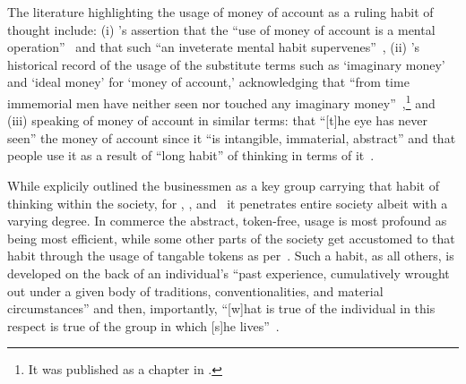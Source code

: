 

The literature highlighting the usage of money of account as a ruling habit of thought include: (i) \citeauthor{colwell1859}'s assertion that the ``use of money of account is a mental operation''~\citep[p.~3]{colwell1859} and that such ``an inveterate mental habit supervenes''~\citep[p.~687]{colwell1860}, (ii) \citeauthor{einaudi1953}'s historical record of the usage of the substitute terms such as `imaginary money' and `ideal money' for `money of account,' acknowledging that ``from time immemorial men have neither seen nor touched any imaginary money''~\cite[p.~230]{einaudi1953},\footnote{It was published as a chapter in \cite{lane1953}.} and (iii) \citeauthor{innes1913} speaking of money of account in similar terms: that ``[t]he eye has never seen'' the money of account since it ``is intangible, immaterial, abstract'' and that people use it as a result of ``long habit'' of thinking in terms of it~\citep[pp.~155,159]{innes1914}.

While \citeauthor{veblen1904} explicily outlined the businessmen as a key group carrying that habit of thinking within the society, for \citeauthor{colwell1859}, \citeauthor{innes1914}, \citeauthor{keynes1930a} and \citeauthor{einaudi1953}~it penetrates entire society albeit with a varying degree. In commerce the abstract, token-free, usage is most profound as being most efficient, while some other parts of the society get accustomed to that habit through the usage of tangable tokens as per~\citep{einaudi1953}. Such a habit, as all others, is developed on the back of an individual's ``past experience, cumulatively wrought out under a given body of traditions, conventionalities, and material circumstances'' and then, importantly, ``[w]hat is true of the individual in this respect is true of the group in which [s]he lives''~\citep[pp.~390-391]{veblen1898}. 


